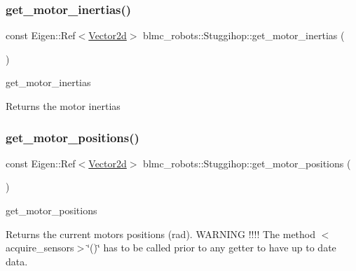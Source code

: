 \subsubsection{\texorpdfstring{get\+\_\+motor\+\_\+inertias()}{get\_motor\_inertias()}}
{\footnotesize\ttfamily const Eigen\+::\+Ref$<$\hyperlink{common__header_8hpp_acb6916bc8c9fe9d98c484fd4cc201447}{Vector2d}$>$ blmc\+\_\+robots\+::\+Stuggihop\+::get\+\_\+motor\+\_\+inertias (\begin{DoxyParamCaption}{ }\end{DoxyParamCaption})\hspace{0.3cm}{\ttfamily [inline]}}



get\+\_\+motor\+\_\+inertias 

\begin{DoxyReturn}{Returns}
the motor inertias 
\end{DoxyReturn}
\mbox{\label{classblmc__robots_1_1Stuggihop_a8d9d32080e9262b319f4f4ce7d85bac1}} 
\subsubsection{\texorpdfstring{get\+\_\+motor\+\_\+positions()}{get\_motor\_positions()}}
{\footnotesize\ttfamily const Eigen\+::\+Ref$<$\hyperlink{common__header_8hpp_acb6916bc8c9fe9d98c484fd4cc201447}{Vector2d}$>$ blmc\+\_\+robots\+::\+Stuggihop\+::get\+\_\+motor\+\_\+positions (\begin{DoxyParamCaption}{ }\end{DoxyParamCaption})\hspace{0.3cm}{\ttfamily [inline]}}



get\+\_\+motor\+\_\+positions 

\begin{DoxyReturn}{Returns}
the current motors positions (rad). W\+A\+R\+N\+I\+NG !!!! The method $<$acquire\+\_\+sensors$>$\char`\"{}()\char`\"{} has to be called prior to any getter to have up to date data. 
\end{DoxyReturn}
\mbox{\label{classblmc__robots_1_1Stuggihop_a8caaf3092fab4df7cb4a21c785a92caa}} 
